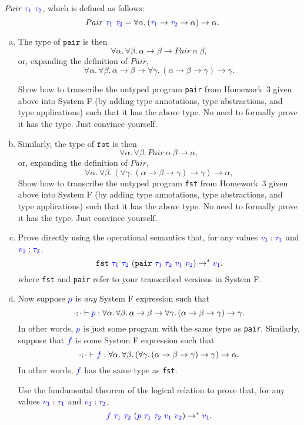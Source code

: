 \documentclass{article}
\theoremstyle{definition}
\newcommand{\meta}[1]{{\color{blue}#1}}
\begin{document}
\begin{enumerate}[start=1,label={{\bf Problem \arabic*}.},ref=\arabic*,left=0pt..0pt,widest*=10,align=left,itemindent=*]
  $Pair\ \meta{\tau_1}\ \meta{\tau_2}$, which is defined as follows:
  \[
    Pair\ \meta{\tau_1}\ \meta{\tau_2} = \forall\alpha.\, (\meta{\tau_1}\to\meta{\tau_2}\to\alpha)\to\alpha.
  \]
  \begin{enumerate}[(a),left=1em]
  \item
    The type of $\mathtt{pair}$ is then
    \[
      \forall\alpha.\,\forall\beta.\, \alpha\to\beta\to Pair\ \alpha\ \beta,
    \]
    or, expanding the definition of $Pair$,
    \[
      \forall\alpha.\,\forall\beta.\, \alpha\to\beta\to \forall\gamma.\, (\alpha\to\beta\to\gamma)\to\gamma.
    \]

    Show how to transcribe the untyped program \texttt{pair} from Homework~3
    given above into System F (by adding type annotations, type abstractions,
    and type applications) such that it has the above type. No need to formally
    prove it has the type. Just convince yourself.
  \item
    Similarly, the type of $\mathtt{fst}$ is then
    \[
      \forall\alpha.\,\forall\beta.\, Pair\ \alpha\ \beta \to \alpha,
    \]
    or, expanding the definition of $Pair$,
    \[
      \forall\alpha.\,\forall\beta.\, (\forall\gamma.\, (\alpha\to\beta\to\gamma)\to\gamma) \to \alpha,
    \]
    Show how to transcribe the untyped program \texttt{fst} from Homework~3
    given above into System F (by adding type annotations, type abstractions,
    and type applications) such that it has the above type. No need to formally
    prove it has the type. Just convince yourself.
  \item Prove directly using the operational semantics that, for any values
    $\meta{v_1}:\meta{\tau_1}$ and $\meta{v_2}:\meta{\tau_2}$,
    \[
      \mathtt{fst}\ \meta{\tau_1}\ \meta{\tau_2}\ (\mathtt{pair}\ \meta{\tau_1}\ \meta{\tau_2}\ \meta{v_1}\ \meta{v_2}) \to^* \meta{v_1}.
    \]
    where \texttt{fst} and \texttt{pair} refer to your transcribed versions in System F.
  \item Now suppose $\meta{p}$ is \emph{any} System F expression such that
    \[
      \cdot;\cdot\vdash \meta{p}:\forall\alpha.\,\forall\beta.\, \alpha\to\beta\to \forall\gamma.\, (\alpha\to\beta\to\gamma)\to\gamma.
    \]
    In other words, $\meta{p}$ is just some program with the same type as
    \texttt{pair}.  Similarly, suppose that $\meta{f}$ is some System F
    expression such that
    \[
      \cdot;\cdot\vdash \meta{f}:\forall\alpha.\,\forall\beta.\, (\forall\gamma.\, (\alpha\to\beta\to\gamma)\to\gamma) \to \alpha.
    \]
    In other words, $\meta{f}$ has the same type as \texttt{fst}.

    Use the fundamental theorem of the logical relation to prove that, for any values
    $\meta{v_1}:\meta{\tau_1}$ and $\meta{v_2}:\meta{\tau_2}$,
    \[
      \meta{f}\ \meta{\tau_1}\ \meta{\tau_2}\ (\meta{p}\ \meta{\tau_1}\ \meta{\tau_2}\ \meta{v_1}\ \meta{v_2}) \to^* \meta{v_1}.
    \]
  \end{enumerate}
\end{enumerate}
\end{document}
